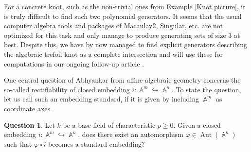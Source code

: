 \documentclass[english]{amsart}
\theoremstyle{definition}
\newtheorem{quest}[prop]{Question}
\DeclareMathOperator{\A}{\mathbb{A}}
\DeclareMathOperator{\Aut}{Aut}
\begin{document}
For a concrete knot, such as the non-trivial ones from Example \ref{Knot picture}, it is truly difficult to find such two polynomial generators. It seems that the usual computer algebra tools and packages of Macaulay2, Singular, etc. are not optimized for this task and only manage to produce generating sets of size 3 at best. Despite this, we have by now managed to find explicit generators describing the algebraic trefoil knot as a complete intersection and will use these for computations in our ongoing follow-up article \cite{WW2}.

\hfill

One central question of Abhyankar \cite{AbMoh} from affine algebraic geometry concerns the so-called rectifiability of closed embedding $i \colon \A^m \hookrightarrow \A^n$. To state the question, let us call such an embedding standard, if it is given by including $\A^m$ as coordinate axes.
\begin{quest}\label{Rectifiability}
Let $k$ be a base field of characteristic $p \geq 0$. Given a closed embedding $i \colon \A^m \hookrightarrow \A^n$, does there exist an automorphism $\varphi \in \Aut(\A^n)$ such that $\varphi \circ i$ becomes a standard embedding?
\end{quest}
\end{document}
